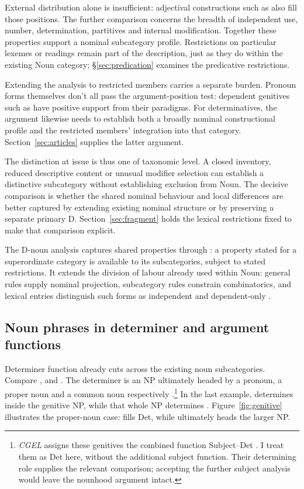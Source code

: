\documentclass[12pt]{article}
\begin{document}
External distribution alone is insufficient: adjectival constructions such as  also fill those positions. The further comparison concerns the breadth of independent use, number, determination, partitives and internal modification. Together these properties support a nominal subcategory profile. Restrictions on particular lexemes or readings remain part of the description, just as they do within the existing Noun category; §\ref{sec:predication} examines the predicative restrictions.

Extending the analysis to restricted members carries a separate burden. Pronoun forms themselves don't all pass the argument-position test: dependent genitives such as  have positive support from their paradigms. For determinatives, the argument likewise needs to establish both a broadly nominal constructional profile and the restricted members' integration into that category. Section~\ref{sec:articles} supplies the latter argument.

The distinction at issue is thus one of taxonomic level. A closed inventory, reduced descriptive content or unusual modifier selection can establish a distinctive subcategory without establishing exclusion from Noun. The decisive comparison is whether the shared nominal behaviour and local differences are better captured by extending existing nominal structure or by preserving a separate primary D. Section~\ref{sec:fragment} holds the lexical restrictions fixed to make that comparison explicit.

The D-noun analysis captures shared properties through : a property stated for a superordinate category is available to its subcategories, subject to stated restrictions. It extends the division of labour already used within Noun: general rules supply nominal projection, subcategory rules constrain combinatorics, and lexical entries distinguish such forms as independent  and dependent-only .

\subsection{Noun phrases in determiner and argument functions}\label{sec:bridge}

Determiner function already cuts across the existing noun subcategories. Compare ,  and . The determiner is an NP ultimately headed by a pronoun, a proper noun and a common noun respectively \citep[354--355, 470--471]{huddleston2002}.\footnote{\textit{CGEL} assigns these genitives the combined function Subject--Det \citep[472--473]{huddleston2002}. I treat them as Det here, without the additional subject function. Their determining role supplies the relevant comparison; accepting the further subject analysis would leave the nounhood argument intact.} In the last example,  determines  inside the genitive NP, while that whole NP determines . Figure~\ref{fig:genitive} illustrates the proper-noun case:  fills Det, while  ultimately heads the larger NP.
\end{document}

